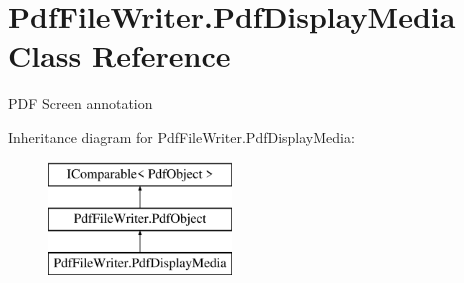 \hypertarget{class_pdf_file_writer_1_1_pdf_display_media}{}\section{Pdf\+File\+Writer.\+Pdf\+Display\+Media Class Reference}
\label{class_pdf_file_writer_1_1_pdf_display_media}


P\+DF Screen annotation  


Inheritance diagram for Pdf\+File\+Writer.\+Pdf\+Display\+Media\+:\begin{figure}[H]
\begin{center}
\leavevmode
\includegraphics[height=3.000000cm]{class_pdf_file_writer_1_1_pdf_display_media}
\end{center}
\end{figure}
